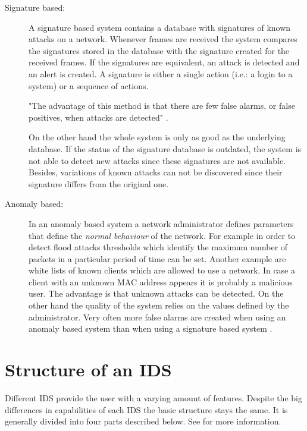\begin{description}
    \item[Signature based:] A signature based system contains a database with signatures of known attacks on a network. Whenever frames are received the system compares the signatures stored in the database with the signature created for the received frames. If the signatures are equivalent, an attack is detected and an alert is created. A signature is either a single action (i.e.: a login to a system) or a sequence of actions.

"The advantage of this method is that there are few false alarms, or false positives, when attacks are detected" \cite[p.9]{wids}.

On the other hand the whole system is only as good as the underlying database. If the status of the signature database is outdated, the system is not able to detect new attacks since these signatures are not available. Besides, variations of known attacks can not be discovered since their signature differs from the original one.

	\item[Anomaly based:] In an anomaly based system a network administrator defines parameters that define the {\em normal behaviour} of the network. For example in order to detect flood attacks thresholds which identify the maximum number of packets in a particular period of time can be set. Another example are white lists of known clients which are allowed to use a network. In case a client with an unknown MAC address appears it is probably a malicious user. The advantage is that unknown attacks can be detected. On the other hand the quality of the system relies on the values defined by the administrator. Very often more false alarms are created when using an anomaly based system than when using a signature based system \cite[p. 3]{IDS_anomaly_false_alarms}.

\end{description} 

\section{Structure of an IDS}
\label{sec:ids_structure}

Different IDS provide the user with a varying amount of features. Despite the big differences in capabilities of each IDS the basic structure stays the same. It is generally divided into four parts described below. See \cite{wids_schreiber} for more information.

